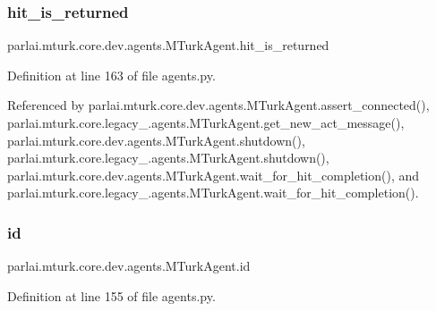 \subsubsection{\texorpdfstring{hit\+\_\+is\+\_\+returned}{hit\_is\_returned}}
{\footnotesize\ttfamily parlai.\+mturk.\+core.\+dev.\+agents.\+M\+Turk\+Agent.\+hit\+\_\+is\+\_\+returned}



Definition at line 163 of file agents.\+py.



Referenced by parlai.\+mturk.\+core.\+dev.\+agents.\+M\+Turk\+Agent.\+assert\+\_\+connected(), parlai.\+mturk.\+core.\+legacy\+\_.\+agents.\+M\+Turk\+Agent.\+get\+\_\+new\+\_\+act\+\_\+message(), parlai.\+mturk.\+core.\+dev.\+agents.\+M\+Turk\+Agent.\+shutdown(), parlai.\+mturk.\+core.\+legacy\+\_.\+agents.\+M\+Turk\+Agent.\+shutdown(), parlai.\+mturk.\+core.\+dev.\+agents.\+M\+Turk\+Agent.\+wait\+\_\+for\+\_\+hit\+\_\+completion(), and parlai.\+mturk.\+core.\+legacy\+\_.\+agents.\+M\+Turk\+Agent.\+wait\+\_\+for\+\_\+hit\+\_\+completion().

\mbox{\label{classparlai_1_1mturk_1_1core_1_1dev_1_1agents_1_1MTurkAgent_a7043c25b96597aa3621e1db10ea2cf4a}} 
\subsubsection{\texorpdfstring{id}{id}}
{\footnotesize\ttfamily parlai.\+mturk.\+core.\+dev.\+agents.\+M\+Turk\+Agent.\+id}



Definition at line 155 of file agents.\+py.



